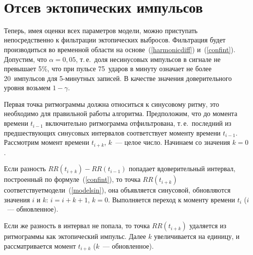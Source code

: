 \begin{multicols}{2}
  \begin{figure*} %
\vspace*{1pt}
\begin{center}
\mbox{%
\epsfxsize=157.775mm
}
\end{center}
\vspace*{-9pt}
\end{figure*}


\section{Отсев эктопических импульсов}%

Теперь, имея оценки всех параметров модели, можно приступать
непосредственно к фильтрации эктопических выбросов. Фильтрация
будет производиться во временной области на основе~(\ref{harmonicdiff})
и~(\ref{confint}). Допустим, что
$\alpha=0{,}05$, т.\,е.\ доля несинусовых импульсов в сигнале не
превышает 5\%, что при пульсе 75~ударов в минуту означает не более
20~импульсов для 5-минутных записей. В качестве значения
доверительного уровня возьмем $1-\gamma$.

Первая  точка ритмограммы должна относиться к синусовому ритму,
это необходимо для правильной работы алгоритма. Предположим, что
до момента времени $t_{i-1}$ включительно ритмограмма
отфильтрована, т.\,е.\ последний из предшествующих синусовых
интервалов соответствует моменту времени $t_{i-1}$. Рассмотрим
момент времени $t_{i+k}$, $k$~--- целое число. Начинаем со значения
$k=0$.
\begin{description}
\item Если разность
$RR(t_{i+k})-RR(t_{i-1})$ попадает в\linebreak доверительный интервал,
построенный по формуле~(\ref{confint}), то точка $RR(t_{i+k})$
соответствует\linebreak модели~(\ref{modelsin}), она объявляется синусовой,
об\-нов\-ля\-ют\-ся значения $i$ и $k$: $i=i+k+1$, $k=0$. Выполняется
переход к моменту времени $t_i$ ($i$~--- обновленное).
\item Если
же разность в интервал не попала, то точка $RR(t_{i+k})$ удаляется
из ритмограммы как эктопический импульс. Далее $k$ увеличивается
на единицу, и рассматривается момент $t_{i+k}$ ($k$~---
обновленное).
\end{description}


\end{multicols}
